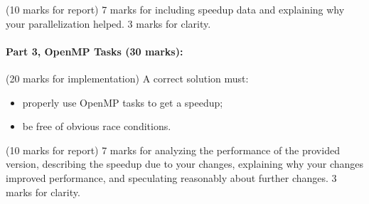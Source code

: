 \documentclass[letterpaper,10pt]{article}
\begin{document}
(10 marks for report) 7 marks for including speedup data and
explaining why your parallelization helped. 3 marks for clarity.

\paragraph{Part 3, OpenMP Tasks (30 marks):} (20 marks for implementation) A correct solution must:
\begin{itemize}
	\item properly use OpenMP tasks to get a speedup;
	\item be free of obvious race conditions.
\end{itemize}

(10 marks for report) 7 marks for analyzing the performance
of the provided version, describing the speedup due to your
changes, explaining why your changes improved performance, and
speculating reasonably about further changes. 3 marks for clarity.
\end{document}
